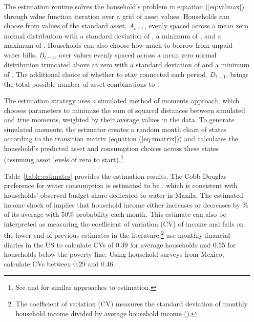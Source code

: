 \documentclass[12pt]{article}
\begin{document}
The estimation routine solves the household's problem in equation (\ref{eq:valmax}) through value function iteration over a grid of asset values.  Households can choose from values of the standard asset, $A_{t+1}$, evenly spaced across a mean zero normal distribution with a standard deviation of \unskip, a minimum of \unskip, and a maximum of \unskip.  Households can also choose how much to borrow from unpaid water bills, $B_{t+1}$, over values evenly spaced across a mean zero normal distribution truncated above at zero with a standard deviation of and a minimum of \unskip.  The additional choice of whether to stay connected each period, $D_{t+1}$, brings the total possible number of asset combinations to \unskip.

The estimation strategy uses a simulated method of moments approach, which chooses parameters to minimize the sum of squared distances between simulated and true moments, weighted by their average values in the data.  To generate simulated moments, the estimator creates a random month chain of states according to the transition matrix (equation (\ref{eq:tmatrix})) and calculates the household's predicted asset and consumption choices across these states (assuming asset levels of zero to start).\footnote{See \cite{laibson2007estimating} and \cite{gourinchas2002consumption} for similar approaches to estimation.}

Table~\ref{table:estimates} provides the estimation results.  The Cobb-Douglas preference for water consumption is estimated to be \unskip, which is consistent with households' observed budget share dedicated to water in Manila.  The estimated income shock of implies that household income either increases or decreases by \unskip\% of its average with 50\% probability each month.  This estimate can also be interpreted as measuring the coefficient of variation (CV) of income and falls on the lower end of previous estimates in the literature.\footnote{The coefficient of variation (CV) measures the standard deviation of monthly household income divided by average household income (\cite{hannagan2015income}).}  \cite{hannagan2015income} use monthly financial diaries in the US to calculate CVs of 0.39 for average households and 0.55 for households below the poverty line.  Using household surveys from Mexico, \cite{amuedo2011remittances} calculate CVs between 0.29 and 0.46. %
\end{document}

